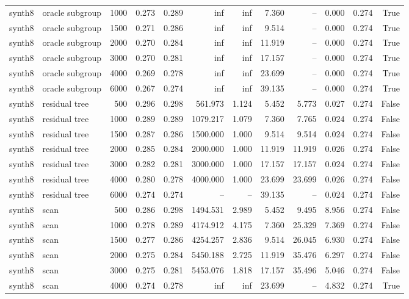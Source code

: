 \begin{tabular}{llrrrrrrrrrr}
synth8 & oracle subgroup & 1000 & 0.273 & 0.289 & inf & inf & 7.360 & -- & 0.000 & 0.274 & True \\
synth8 & oracle subgroup & 1500 & 0.271 & 0.286 & inf & inf & 9.514 & -- & 0.000 & 0.274 & True \\
synth8 & oracle subgroup & 2000 & 0.270 & 0.284 & inf & inf & 11.919 & -- & 0.000 & 0.274 & True \\
synth8 & oracle subgroup & 3000 & 0.270 & 0.281 & inf & inf & 17.157 & -- & 0.000 & 0.274 & True \\
synth8 & oracle subgroup & 4000 & 0.269 & 0.278 & inf & inf & 23.699 & -- & 0.000 & 0.274 & True \\
synth8 & oracle subgroup & 6000 & 0.267 & 0.274 & inf & inf & 39.135 & -- & 0.000 & 0.274 & True \\
synth8 & residual tree & 500 & 0.296 & 0.298 & 561.973 & 1.124 & 5.452 & 5.773 & 0.027 & 0.274 & False \\
synth8 & residual tree & 1000 & 0.289 & 0.289 & 1079.217 & 1.079 & 7.360 & 7.765 & 0.024 & 0.274 & False \\
synth8 & residual tree & 1500 & 0.287 & 0.286 & 1500.000 & 1.000 & 9.514 & 9.514 & 0.024 & 0.274 & False \\
synth8 & residual tree & 2000 & 0.285 & 0.284 & 2000.000 & 1.000 & 11.919 & 11.919 & 0.026 & 0.274 & False \\
synth8 & residual tree & 3000 & 0.282 & 0.281 & 3000.000 & 1.000 & 17.157 & 17.157 & 0.024 & 0.274 & False \\
synth8 & residual tree & 4000 & 0.280 & 0.278 & 4000.000 & 1.000 & 23.699 & 23.699 & 0.026 & 0.274 & False \\
synth8 & residual tree & 6000 & 0.274 & 0.274 & -- & -- & 39.135 & -- & 0.024 & 0.274 & False \\
synth8 & scan & 500 & 0.286 & 0.298 & 1494.531 & 2.989 & 5.452 & 9.495 & 8.956 & 0.274 & False \\
synth8 & scan & 1000 & 0.278 & 0.289 & 4174.912 & 4.175 & 7.360 & 25.329 & 7.369 & 0.274 & False \\
synth8 & scan & 1500 & 0.277 & 0.286 & 4254.257 & 2.836 & 9.514 & 26.045 & 6.930 & 0.274 & False \\
synth8 & scan & 2000 & 0.275 & 0.284 & 5450.188 & 2.725 & 11.919 & 35.476 & 6.297 & 0.274 & False \\
synth8 & scan & 3000 & 0.275 & 0.281 & 5453.076 & 1.818 & 17.157 & 35.496 & 5.046 & 0.274 & False \\
synth8 & scan & 4000 & 0.274 & 0.278 & inf & inf & 23.699 & -- & 4.832 & 0.274 & True \\

\end{tabular}

